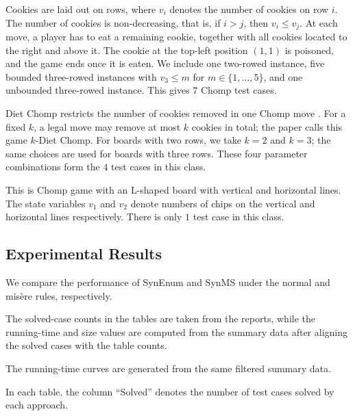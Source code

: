 \documentclass[review]{elsarticle}
\begin{document}
\begin{description}
	\item[Chomp] Cookies are laid out on rows, where $v_i$ denotes the number of cookies on row $i$.
	The number of cookies is non-decreasing, that is, if $i > j$, then $v_i \leq v_j$.
	At each move, a player has to eat a remaining cookie, together with all cookies located to the right and above it. 
	The cookie at the top-left position $(1, 1)$ is poisoned, and the game ends once it is eaten. 
	{\color{red}We include one two-rowed instance, five bounded three-rowed instances with $v_3 \leq m$ for $m \in \{1,\ldots,5\}$, and one unbounded three-rowed instance.
	This gives $7$ Chomp test cases.}
	
	{\color{red}
	\item[$k$-Diet Chomp] Diet Chomp restricts the number of cookies removed in one Chomp move \cite{AhnCCEFGGKMPS2017}.
	For a fixed $k$, a legal move may remove at most $k$ cookies in total; the paper calls this game $k$-Diet Chomp.
	For boards with two rows, we take $k=2$ and $k=3$; the same choices are used for boards with three rows.
	These four parameter combinations form the $4$ test cases in this class.
	}
	
	\item[L-shaped Chomp] This is Chomp game with an L-shaped board with vertical and horizontal lines. 
	The state variables $ v_1$ and $v_2$ denote numbers of chips on the vertical and horizontal lines respectively.
	There is only $1$ test case in this class.
\end{description}



\subsection{Experimental Results}


We compare the performance of SynEnum and SynMS under the normal and mis\`{e}re rules, respectively.

The solved-case counts in the tables are taken from the reports, while the running-time and size values are computed from the summary data after aligning the solved cases with the table counts.

The running-time curves are generated from the same filtered summary data.

In each table, the column ``Solved'' denotes the number of test cases solved by each approach.
\end{document}
